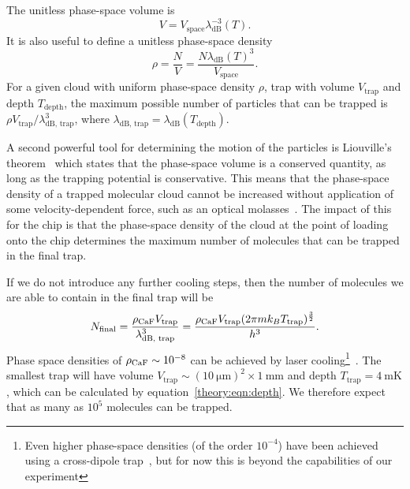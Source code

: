 The unitless phase-space volume is
%
\begin{equation}
  V = V_\text{space} \lambda_\text{dB}^{-3}(T).
\end{equation}
%
It is also useful to define a unitless phase-space
density~\cite{PhysRevA.52.1423}
%
\begin{equation}
  \rho = \frac{N}{V} = \frac{N \lambda_\text{dB}(T)^3}{V_\text{space}}.
\end{equation}
%
For a given cloud with uniform phase-space density $\rho$, trap with volume
$V_\text{trap}$ and depth $T_\text{depth}$, the maximum possible number of
particles that can be trapped is $\rho V_\text{trap}/\lambda_\text{dB,
trap}^3$, where $\lambda_\text{dB, trap} = \lambda_\text{dB}(T_\text{depth})$.

A second powerful tool for determining the motion of the particles is
Liouville's theorem~\cite{Landau1982, Hand1998} which states that the phase-space
volume is a conserved quantity, as long as the trapping potential is
conservative. This means that the phase-space density of a trapped molecular
cloud cannot be increased without application of some velocity-dependent
force, such as an optical molasses~\cite{Metcalf1999}. The impact of this for
the chip is that the phase-space density of the cloud at the point of loading
onto the chip determines the maximum number of molecules that can be trapped in
the final trap.

If we do not introduce any further cooling steps, then the number of molecules
we are able to contain in the final trap will be
%
\begin{equation}
  N_\text{final} = \frac{\rho_\text{CaF{}}V_\text{trap}}
  {\lambda_\text{dB, trap}^3} = \frac{\rho_\text{CaF{}} V_\text{trap}(2 \pi m k_B
  T_\text{trap})^\frac{3}{2}}{h^3}.
  \label{sim:eq:psd_N}
\end{equation}
%
Phase space densities of $\rho_\text{CaF{}} \sim 10^{-8}$ can be achieved by
laser cooling\footnote{Even higher phase-space densities (of the order
  $10^{-4}$) have been achieved using a cross-dipole trap~\cite{Anderegg2019a},
  but for now this is beyond the capabilities of our
experiment}~\cite{PhysRevLett.121.083201}. The smallest trap will have volume
$V_\text{trap}\sim(\SI{10}{\micro\meter})^2\times\SI{1}{\milli\meter}$ and
depth $T_\text{trap}=\SI{4}{\milli\kelvin}$, which can be calculated by
equation~\ref{theory:eqn:depth}.
%
We therefore expect that as many as $10^5$ molecules can be trapped.

